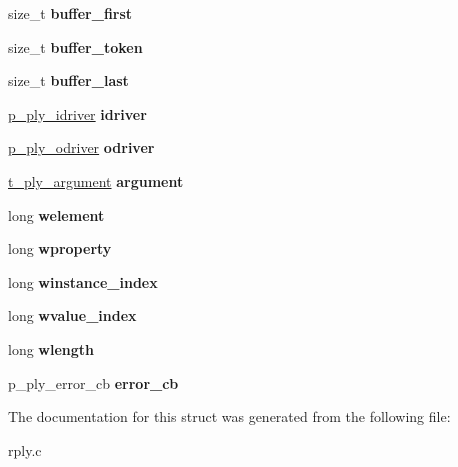 \begin{DoxyCompactItemize}
\item 
\mbox{\label{structt__ply___a09f60faf79c174f9ec79599a0b77e790}} 
size\+\_\+t {\bfseries buffer\+\_\+first}
\item 
\mbox{\label{structt__ply___a15e8ece9572100ce5213e8b221bf6057}} 
size\+\_\+t {\bfseries buffer\+\_\+token}
\item 
\mbox{\label{structt__ply___a1ae894dcae5850948a9855d9e449baec}} 
size\+\_\+t {\bfseries buffer\+\_\+last}
\item 
\mbox{\label{structt__ply___aecaa80a70a03721553ebeab9fe9a22e0}} 
\hyperlink{structt__ply__idriver__}{p\+\_\+ply\+\_\+idriver} {\bfseries idriver}
\item 
\mbox{\label{structt__ply___ab76942a651062d0747637e8df5632e24}} 
\hyperlink{structt__ply__odriver__}{p\+\_\+ply\+\_\+odriver} {\bfseries odriver}
\item 
\mbox{\label{structt__ply___affbe7e3e937f7f039f496d8a57b16904}} 
\hyperlink{structt__ply__argument__}{t\+\_\+ply\+\_\+argument} {\bfseries argument}
\item 
\mbox{\label{structt__ply___ad83687478a4c519a0840e6203cc92e81}} 
long {\bfseries welement}
\item 
\mbox{\label{structt__ply___a3c1346b6f0538336dfa64b1db7c80545}} 
long {\bfseries wproperty}
\item 
\mbox{\label{structt__ply___ad0eb60ffe6347b945be7773a4eb6b01c}} 
long {\bfseries winstance\+\_\+index}
\item 
\mbox{\label{structt__ply___ad9286509435ac2873054e010dd3675e5}} 
long {\bfseries wvalue\+\_\+index}
\item 
\mbox{\label{structt__ply___ad8ac030b015c75d0cbb14cbb7f899b68}} 
long {\bfseries wlength}
\item 
\mbox{\label{structt__ply___a3f9870cbe445137d16da2173363bc810}} 
p\+\_\+ply\+\_\+error\+\_\+cb {\bfseries error\+\_\+cb}
\end{DoxyCompactItemize}


The documentation for this struct was generated from the following file\+:\begin{DoxyCompactItemize}
\item 
rply.\+c\end{DoxyCompactItemize}
